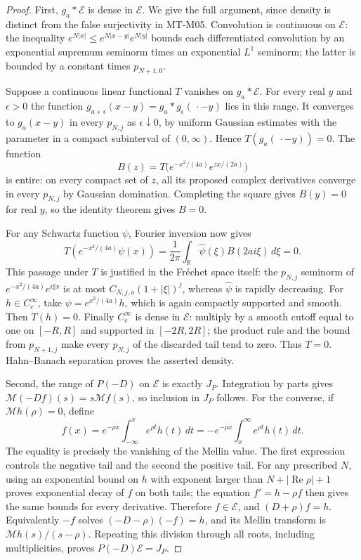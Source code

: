 \begin{proof}
First, $g_a*\mathcal E$ is dense in $\mathcal E$. We give the full
argument, since density is distinct from the false surjectivity in
MT-M05. Convolution is continuous on $\mathcal E$: the inequality
$e^{N|x|}\le e^{N|x-y|}e^{N|y|}$ bounds each differentiated
convolution by an exponential supremum seminorm times an exponential
$L^1$ seminorm; the latter is bounded by a constant times
$p_{N+1,0}$.

Suppose a continuous linear functional $T$ vanishes on
$g_a*\mathcal E$. For every real $y$ and $\epsilon>0$ the function
$g_{a+\epsilon}(x-y)=g_a*g_\epsilon(\,\cdot-y)$ lies in this range.
It converges to $g_a(x-y)$ in every $p_{N,j}$ as
$\epsilon\downarrow0$, by uniform Gaussian estimates with the
parameter in a compact subinterval of $(0,\infty)$. Hence
$T(g_a(\,\cdot-y))=0$. The function
\[
 B(z)=T\bigl(e^{-x^2/(4a)}e^{zx/(2a)}\bigr)
\]
is entire: on every compact set of $z$, all its proposed complex
derivatives converge in every $p_{N,j}$ by Gaussian domination.
Completing the square gives $B(y)=0$ for real $y$, so the identity
theorem gives $B=0$.

For any Schwartz function $\psi$, Fourier inversion now gives
\[
 T(e^{-x^2/(4a)}\psi(x))
  =\frac1{2\pi}\int_{\mathbb R}\widehat\psi(\xi)
        B(2ai\xi)\,d\xi=0.
\]
This passage under $T$ is justified in the Fr\'echet space itself:
the $p_{N,j}$ seminorm of
$e^{-x^2/(4a)}e^{i\xi x}$ is at most
$C_{N,j,a}(1+|\xi|)^j$, whereas $\widehat\psi$ is rapidly
decreasing. For $h\in C_c^\infty$, take
$\psi=e^{x^2/(4a)}h$, which is again compactly supported and smooth.
Then $T(h)=0$. Finally $C_c^\infty$ is dense in $\mathcal E$:
multiply by a smooth cutoff equal to one on $[-R,R]$ and supported
in $[-2R,2R]$; the product rule and the bound from $p_{N+1,j}$ make
every $p_{N,j}$ of the discarded tail tend to zero. Thus $T=0$.
Hahn--Banach separation proves the asserted density.

Second, the range of $P(-D)$ on $\mathcal E$ is exactly $J_P$.
Integration by parts gives $\mathcal M(-Df)(s)=s\mathcal Mf(s)$,
so inclusion in $J_P$ follows. For the converse, if
$\mathcal Mh(\rho)=0$, define
\[
 f(x)=e^{-\rho x}\int_{-\infty}^x e^{\rho t}h(t)\,dt
     =-e^{-\rho x}\int_x^\infty e^{\rho t}h(t)\,dt.
\]
The equality is precisely the vanishing of the Mellin value.
The first expression controls the negative tail and the second the
positive tail. For any prescribed $N$, using an exponential bound
on $h$ with exponent larger than $N+|\operatorname{Re}\rho|+1$
proves exponential decay of $f$ on both tails; the equation
$f'=h-\rho f$ then gives the same bounds for every derivative.
Therefore $f\in\mathcal E$, and $(D+\rho)f=h$.
Equivalently $-f$ solves $(-D-\rho)(-f)=h$, and its Mellin transform
is $\mathcal Mh(s)/(s-\rho)$. Repeating this division through all
roots, including multiplicities, proves $P(-D)\mathcal E=J_P$.


\end{proof}
